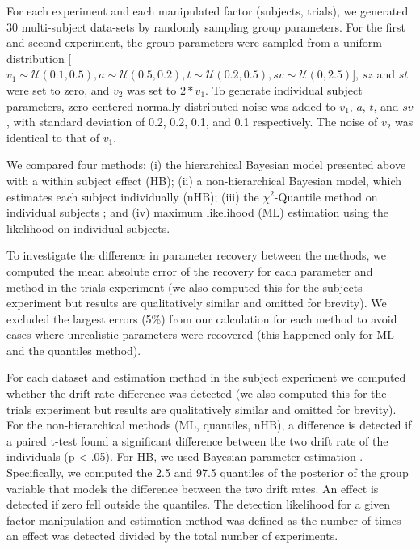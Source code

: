 \documentclass[letterpaper,10pt,english]{article}
\begin{document}
For each experiment and each manipulated factor (subjects, trials), we generated 30 multi-subject data-sets by randomly sampling group parameters. For the first and second experiment, the group parameters were sampled from a uniform distribution [$v_{\text{1}} \sim \mathcal{U}(0.1, 0.5), a \sim \mathcal{U}(0.5, 0.2), t \sim \mathcal{U}(0.2, 0.5), sv \sim \mathcal{U}(0, 2.5)$], $sz$ and $st$ were set to zero, and $v_{\text{2}}$ was set to $2*v_{\text{1}}$. To generate individual subject parameters, zero centered normally distributed noise was added to $v_{\text{1}}$, $a$, $t$, and $sv$, with standard deviation of 0.2, 0.2, 0.1, and 0.1 respectively. The noise of $v_{\text{2}}$ was identical to that of $v_{\text{1}}$.

We compared four methods: (i) the hierarchical Bayesian model
presented above with a within subject effect (HB); (ii) a
non-hierarchical Bayesian model, which estimates each subject
individually (nHB); (iii) the $\chi^2$-Quantile method on individual
subjects \citep{RatcliffTuerlinckx02}; and (iv) maximum likelihood
(ML) estimation using the \citet{NavarroFuss09} likelihood on
individual subjects.

To investigate the difference in parameter recovery between the methods, we computed the mean absolute error of the recovery for each parameter and method in the trials experiment (we also computed this for the subjects experiment but results are qualitatively similar and omitted for brevity). We excluded the largest errors (5\%) from our calculation for each method to avoid cases where unrealistic parameters were recovered (this happened only for ML and the quantiles method).

For each dataset and estimation method in the subject experiment we computed whether the drift-rate difference was detected (we also computed this for the trials experiment but results are qualitatively similar and omitted for brevity). For the non-hierarchical methods (ML, quantiles, nHB), a difference is detected if a paired t-test found a significant difference between the two drift rate of the individuals (p < .05).  For HB, we used Bayesian parameter estimation \citep{Lindley65,Kruschke10}. Specifically, we computed the 2.5 and 97.5 quantiles of the posterior of the group variable that models the difference between the two drift rates. An effect is detected if zero fell outside the quantiles. The detection likelihood for a given factor manipulation and estimation method was defined as the number of times an effect was detected divided by the total number of experiments.
\end{document}
